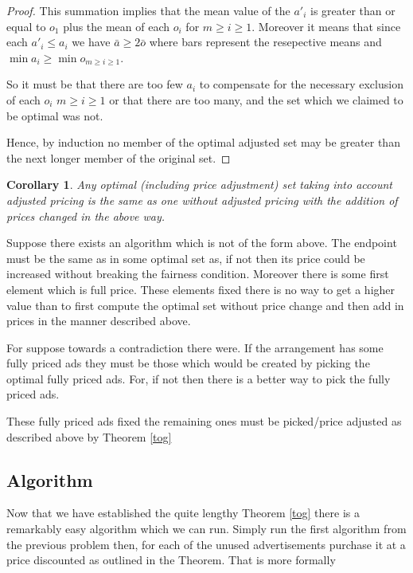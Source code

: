 \documentclass{article}
\newtheorem{corollary}[theorem]{Corollary}
\begin{document}
\begin{proof}
This summation implies that the mean value of the $a'_i$ is greater than or equal to $o_1$ plus the mean of each $o_i$ for $m\geq i \geq 1$. Moreover it means that since each $a'_i \leq a_i$ we have $\bar{a} \geq 2 \bar{o}$ where bars represent the resepective means and $\min{a_i}\geq\min{o_{m\geq i \geq 1}}$.

So it must be that there are too few $a_i$ to compensate for the necessary exclusion of each $o_i$ $m\geq i \geq 1$ or that there are too many, and the set which we claimed to be optimal was not.



Hence, by induction no member of the optimal adjusted set may be greater than the next longer member of the original set.

\end{proof}

\begin{corollary}\label{lw}Any optimal (including price adjustment) set taking into account adjusted pricing is the same as one without adjusted pricing with the addition of prices changed in the above way.
\end{corollary}

Suppose there exists an algorithm which is not of the form above. The endpoint must be the same as in some optimal set as, if not then its price could be increased without breaking the fairness condition. Moreover there is some first element which is full price. These elements fixed there is no way to get a higher value than to first compute the optimal set without price change and then add in prices in the manner described above.

For suppose towards a contradiction there were. If the arrangement has some fully priced ads they must be those which would be created by picking the optimal fully priced ads. For, if not then there is a better way to pick the fully priced ads.

These fully priced ads fixed the remaining ones must be picked/price adjusted as described above by Theorem \ref{tog}

\subsection{Algorithm}

Now that we have established the quite lengthy Theorem \ref{tog} there is a remarkably easy algorithm which we can run. Simply run the first algorithm from the previous problem then, for each of the unused advertisements purchase it at a price discounted as outlined in the Theorem. That is more formally
\end{document}
